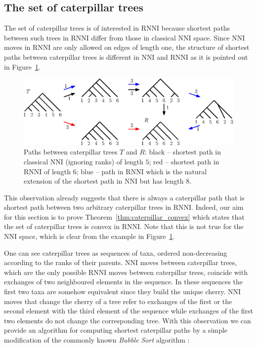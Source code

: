 \documentclass{amsart}
\newcommand{\nni}{\mathrm{NNI}}
\newcommand{\rnni}{\mathrm{RNNI}}
\begin{document}
\subsection{The set of caterpillar trees}
\label{section:caterpillar_convex}

The set of caterpillar trees is of interested in $\rnni$ because shortest paths between such trees in $\rnni$ differ from those in classical $\nni$ space.
Since $\nni$ moves in $\rnni$ are only allowed on edges of length one, the structure of shortest paths between caterpillar trees is different in $\nni$ and $\rnni$ as it is pointed out in Figure~\ref{fig:NNI_vs_RNNI}.

\begin{figure}[H]
	\centering
	\includegraphics[width=\textwidth]{NNI_vs_RNNI}
	\caption{Paths between caterpillar trees $T$ and $R$: black -- shortest path in classical $\nni$ (ignoring ranks) of length $5$; red -- shortest path in $\rnni$ of length $6$; blue -- path in $\rnni$ which is the natural extension of the shortest path in $\nni$ but has length $8$.}
	\label{fig:NNI_vs_RNNI}
\end{figure}

This observation already suggests that there is always a caterpillar path that is shortest path between two arbitrary caterpillar trees in $\rnni$.
Indeed, our aim for this section is to prove Theorem~\ref{thm:caterpillar_convex} which states that the set of caterpillar trees is convex in $\rnni$.
Note that this is not true for the $\nni$ space, which is clear from the example in Figure~\ref{fig:NNI_vs_RNNI}.

One can see caterpillar trees as sequences of taxa, ordered non-decreasing according to the ranks of their parents.
$\nni$ moves between caterpillar trees, which are the only possible $\rnni$ moves between caterpillar trees, coincide with exchanges of two neighboured elements in the sequence.
In these sequences the first two taxa are somehow equivalent since they build the unique cherry.
$\nni$ moves that change the cherry of a tree refer to exchanges of the first or the second element with the third element of the sequence while exchanges of the first two elements do not change the corresponding tree.
With this observation we can provide an algorithm for computing shortest caterpillar paths by a simple modification of the commonly known \emph{Bubble Sort} algorithm \autocite{knuth1997}:
\end{document}
